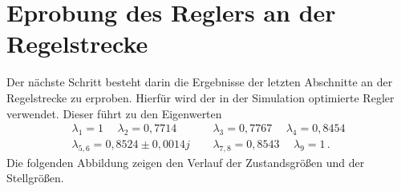 \section{Eprobung des Reglers an der Regelstrecke}
Der nächste Schritt besteht darin die Ergebnisse der letzten Abschnitte an der Regelstrecke zu erproben. Hierfür wird der in der Simulation optimierte Regler verwendet. Dieser führt zu den Eigenwerten
\begin{equation}
\begin{split}
\lambda_1 = 1 \hspace{15pt} \lambda_2 = 0{,}7714 \hspace{15pt} &\lambda_3 = 0{,}7767 \hspace{15pt} \lambda_4 = 0{,}8454
\\
\lambda_{5,6} = 0{,}8524\pm0{,}0014j \hspace{15pt} &\lambda_{7,8} = 0{,}8543 \hspace{15pt} \lambda_9 = 1 \,.
\end{split}
\label{eq_ew1_corner}
\end{equation}
Die folgenden Abbildung zeigen den Verlauf der Zustandsgrößen und der Stellgrößen.

